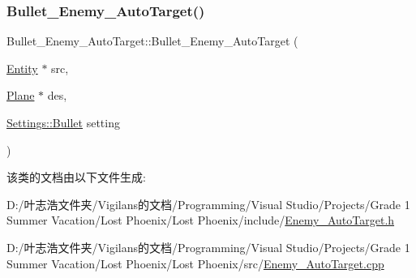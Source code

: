 \subsubsection{\texorpdfstring{Bullet\+\_\+\+Enemy\+\_\+\+Auto\+Target()}{Bullet\_Enemy\_AutoTarget()}}
{\footnotesize\ttfamily Bullet\+\_\+\+Enemy\+\_\+\+Auto\+Target\+::\+Bullet\+\_\+\+Enemy\+\_\+\+Auto\+Target (\begin{DoxyParamCaption}\item[{\hyperlink{class_entity}{Entity} $\ast$}]{src,  }\item[{\hyperlink{class_plane}{Plane} $\ast$}]{des,  }\item[{\hyperlink{struct_settings_1_1_bullet}{Settings\+::\+Bullet}}]{setting }\end{DoxyParamCaption})}



该类的文档由以下文件生成\+:\begin{DoxyCompactItemize}
\item 
D\+:/叶志浩文件夹/\+Vigilans的文档/\+Programming/\+Visual Studio/\+Projects/\+Grade 1 Summer Vacation/\+Lost Phoenix/\+Lost Phoenix/include/\hyperlink{_enemy___auto_target_8h}{Enemy\+\_\+\+Auto\+Target.\+h}\item 
D\+:/叶志浩文件夹/\+Vigilans的文档/\+Programming/\+Visual Studio/\+Projects/\+Grade 1 Summer Vacation/\+Lost Phoenix/\+Lost Phoenix/src/\hyperlink{_enemy___auto_target_8cpp}{Enemy\+\_\+\+Auto\+Target.\+cpp}\end{DoxyCompactItemize}
